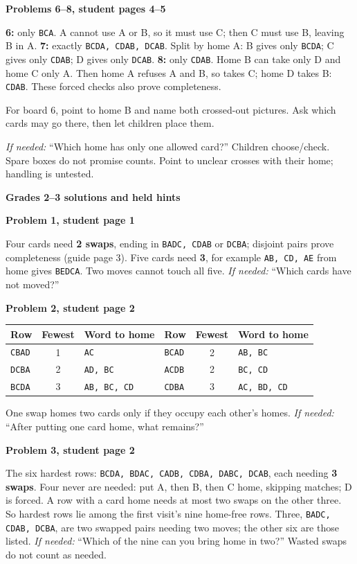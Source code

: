 \documentclass[11pt]{article}
\newcommand{\head}[1]{\par\textbf{\large #1}\par}
\newcommand{\sub}[1]{\par\textbf{#1}\par}
\newcommand{\row}[1]{\texttt{#1}}
\newcommand{\hint}[1]{\emph{If needed:} #1}
\begin{document}
\sub{Problems 6--8, student pages 4--5}
\textbf{6:} only \row{BCA}. A cannot use A or B, so it must use C; then C must use B, leaving B in A. \textbf{7:} exactly \row{BCDA, CDAB, DCAB}. Split by home A: B gives only \row{BCDA}; C gives only \row{CDAB}; D gives only \row{DCAB}. \textbf{8:} only \row{CDAB}. Home B can take only D and home C only A. Then home A refuses A and B, so takes C; home D takes B: \row{CDAB}. These forced checks also prove completeness.

For board 6, point to home B and name both crossed-out pictures. Ask which cards may go there, then let children place them.

\hint{``Which home has only one allowed card?''} Children choose/check. Spare boxes do not promise counts. Point to unclear crosses with their home; handling is untested.
\newpage
\head{Grades 2--3 solutions and held hints}
\sub{Problem 1, student page 1}
Four cards need \textbf{2 swaps}, ending in \row{BADC, CDAB} or \row{DCBA}; disjoint pairs prove completeness (guide page 3). Five cards need \textbf{3}, for example \row{AB, CD, AE} from home gives \row{BEDCA}. Two moves cannot touch all five. \hint{``Which cards have not moved?''}

\sub{Problem 2, student page 2}
\begin{center}\small\renewcommand{\arraystretch}{1.1}
\begin{tabular}{lcl@{\qquad}lcl}
Row & Fewest & Word to home & Row & Fewest & Word to home\\\midrule
\row{CBAD}&1&\row{AC}&\row{BCAD}&2&\row{AB, BC}\\
\row{DCBA}&2&\row{AD, BC}&\row{ACDB}&2&\row{BC, CD}\\
\row{BCDA}&3&\row{AB, BC, CD}&\row{CDBA}&3&\row{AC, BD, CD}
\end{tabular}
\end{center}
One swap homes two cards only if they occupy each other's homes. \hint{``After putting one card home, what remains?''}

\sub{Problem 3, student page 2}
The six hardest rows: \row{BCDA, BDAC, CADB, CDBA, DABC, DCAB}, each needing \textbf{3 swaps}. Four never are needed: put A, then B, then C home, skipping matches; D is forced. A row with a card home needs at most two swaps on the other three. So hardest rows lie among the first visit's nine home-free rows. Three, \row{BADC, CDAB, DCBA}, are two swapped pairs needing two moves; the other six are those listed. \hint{``Which of the nine can you bring home in two?''} Wasted swaps do not count as needed.
\end{document}
